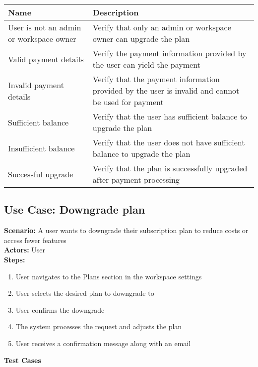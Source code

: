 \documentclass{article}
\begin{document}
            \begin{longtable}{|p{}|p{}|}
            \hline
            \textbf{Name} & \textbf{Description} \\
            \hline
            User is not an admin or workspace owner & Verify that only an admin or workspace owner can upgrade the plan \\
\hline
Valid payment details & Verify the payment information provided by the user can yield the payment \\
\hline
Invalid payment details & Verify that the payment information provided by the user is invalid and cannot be used for payment \\
\hline
Sufficient balance & Verify that the user has sufficient balance to upgrade the plan \\
\hline
Insufficient balance & Verify that the user does not have sufficient balance to upgrade the plan \\
\hline
Successful upgrade & Verify that the plan is successfully upgraded after payment processing \\
\hline
\end{longtable}\subsection{\textbf{Use Case: Downgrade plan}}
\textbf{Scenario:} A user wants to downgrade their subscription plan to reduce costs or access fewer features\\
\textbf{Actors:} User\\
\textbf{Steps:}
\begin{enumerate}
\item User navigates to the Plans section in the workspace settings
\item User selects the desired plan to downgrade to
\item User confirms the downgrade
\item The system processes the request and adjusts the plan
\item User receives a confirmation message along with an email
\end{enumerate}
\textbf{Test Cases}
\end{document}
